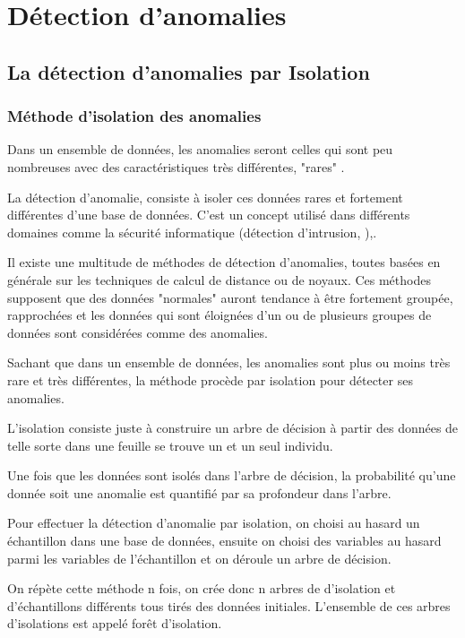 \part{Détection d'anomalies}
\label{prt:detection}

\chapter{La détection d'anomalies par Isolation} 

\section{Méthode d'isolation des anomalies}

Dans un ensemble de données, les anomalies seront celles qui sont peu nombreuses avec des caractéristiques très différentes, "rares" .

La détection d'anomalie, consiste à isoler ces données rares et fortement différentes d'une base de données. C'est un concept utilisé dans différents domaines comme la sécurité informatique (détection d'intrusion, ),.

Il existe une multitude de méthodes de détection d'anomalies, toutes basées en générale sur les techniques de calcul de distance ou de noyaux. Ces méthodes supposent que des données "normales" auront tendance à être fortement groupée, rapprochées et les données qui sont éloignées d'un ou de plusieurs groupes de données sont considérées comme des anomalies.

Sachant que dans un ensemble de données, les anomalies sont plus ou moins très rare et très différentes, la méthode procède par isolation pour détecter ses anomalies.

L'isolation consiste juste à construire un arbre de décision à partir des données de telle sorte dans une feuille se trouve un et un seul individu.

Une fois que les données sont isolés dans l'arbre de décision, la probabilité qu'une donnée soit une anomalie est quantifié par sa profondeur dans l'arbre.

Pour effectuer la détection d'anomalie par isolation, on choisi au hasard un échantillon dans une base de données, ensuite on choisi des variables au hasard parmi les variables de l'échantillon et on déroule un arbre de décision.

On répète cette méthode n fois, on crée donc n arbres de d'isolation et d'échantillons différents tous tirés des données initiales. L'ensemble de ces arbres d'isolations est appelé forêt d'isolation.

